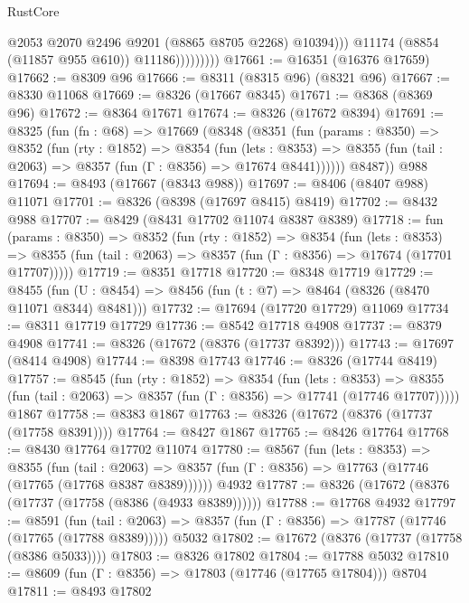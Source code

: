 \begin{lexlean}{RustCore}
\begin{coremodule}
                            @2053
                            @2070
                            @2496
                            @9201
                            (@8865 @8705 @2268)
                            @10394)))
                      @11174
                      (@8854 (@11857 @955 @610))
                      @11186)))))))))
@17661 := @16351 (@16376 @17659)
@17662 := @8309 @96
@17666 := @8311 (@8315 @96) (@8321 @96)
@17667 := @8330 @11068
@17669 := @8326 (@17667 @8345)
@17671 := @8368 (@8369 @96)
@17672 := @8364 @17671
@17674 := @8326 (@17672 @8394)
@17691 := @8325
    (fun (fn : @68) =>
    @17669
      (@8348
        (@8351
          (fun (params : @8350) =>
          @8352
            (fun (rty : @1852) =>
            @8354
              (fun (lets : @8353) =>
              @8355 (fun (tail : @2063) => @8357 (fun (Γ : @8356) => @17674 @8441))))))
        @8487))
    @988
@17694 := @8493 (@17667 (@8343 @988))
@17697 := @8406 (@8407 @988) @11071
@17701 := @8326 (@8398 (@17697 @8415) @8419)
@17702 := @8432 @988
@17707 := @8429 (@8431 @17702 @11074 @8387 @8389)
@17718 := fun (params : @8350) =>
  @8352
    (fun (rty : @1852) =>
    @8354
      (fun (lets : @8353) =>
      @8355 (fun (tail : @2063) => @8357 (fun (Γ : @8356) => @17674 (@17701 @17707)))))
@17719 := @8351 @17718
@17720 := @8348 @17719
@17729 := @8455
    (fun (U : @8454) => @8456 (fun (t : @7) => @8464 (@8326 (@8470 @11071 @8344) @8481)))
@17732 := @17694 (@17720 @17729) @11069
@17734 := @8311 @17719 @17729
@17736 := @8542 @17718 @4908
@17737 := @8379 @4908
@17741 := @8326 (@17672 (@8376 (@17737 @8392)))
@17743 := @17697 (@8414 @4908)
@17744 := @8398 @17743
@17746 := @8326 (@17744 @8419)
@17757 := @8545
    (fun (rty : @1852) =>
    @8354
      (fun (lets : @8353) =>
      @8355 (fun (tail : @2063) => @8357 (fun (Γ : @8356) => @17741 (@17746 @17707)))))
    @1867
@17758 := @8383 @1867
@17763 := @8326 (@17672 (@8376 (@17737 (@17758 @8391))))
@17764 := @8427 @1867
@17765 := @8426 @17764
@17768 := @8430 @17764 @17702 @11074
@17780 := @8567
    (fun (lets : @8353) =>
    @8355
      (fun (tail : @2063) =>
      @8357 (fun (Γ : @8356) => @17763 (@17746 (@17765 (@17768 @8387 @8389))))))
    @4932
@17787 := @8326 (@17672 (@8376 (@17737 (@17758 (@8386 (@4933 @8389))))))
@17788 := @17768 @4932
@17797 := @8591
    (fun (tail : @2063) => @8357 (fun (Γ : @8356) => @17787 (@17746 (@17765 (@17788 @8389)))))
    @5032
@17802 := @17672 (@8376 (@17737 (@17758 (@8386 @5033))))
@17803 := @8326 @17802
@17804 := @17788 @5032
@17810 := @8609 (fun (Γ : @8356) => @17803 (@17746 (@17765 @17804))) @8704
@17811 := @8493 @17802

\end{coremodule}
\end{lexlean}
